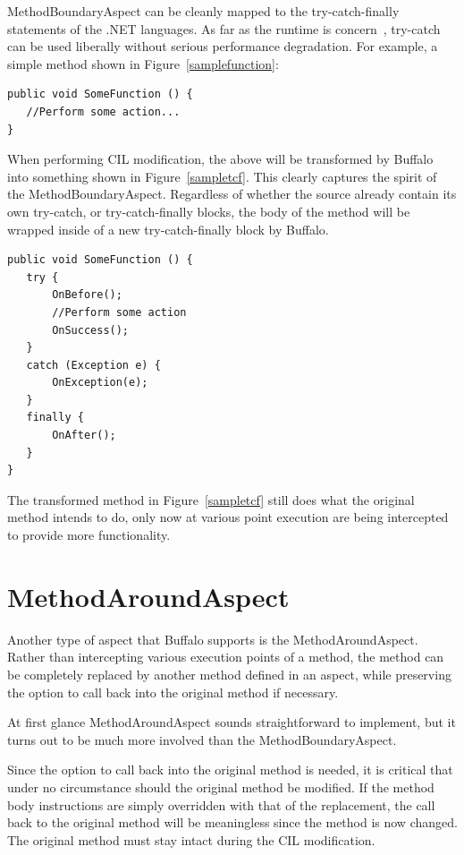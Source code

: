 MethodBoundaryAspect can be cleanly mapped to the try-catch-finally statements of the .NET languages. As far as the runtime is concern~\cite{ecma334, ecma335}, try-catch can be used liberally without serious performance degradation. For example, a simple method shown in Figure~\ref{samplefunction}:

\begin{lstlisting}[caption={Sample function}, label=samplefunction]
public void SomeFunction () {
   //Perform some action...
}
\end{lstlisting}

When performing CIL modification, the above will be transformed by Buffalo into something shown in Figure~\ref{sampletcf}. This clearly captures the spirit of the MethodBoundaryAspect. Regardless of whether the source already contain its own try-catch, or try-catch-finally blocks, the body of the method will be wrapped inside of a new try-catch-finally block by Buffalo.

\begin{lstlisting}[caption={Sample try-catch-finally}, label=sampletcf]
public void SomeFunction () {
   try {
       OnBefore();
       //Perform some action
       OnSuccess();
   }
   catch (Exception e) {
       OnException(e);
   }
   finally {
       OnAfter();
   }
}
\end{lstlisting}

The transformed method in Figure~\ref{sampletcf} still does what the original method intends to do, only now at various point execution are being intercepted to provide more functionality. 

\section{MethodAroundAspect}
Another type of aspect that Buffalo supports is the MethodAroundAspect. Rather than intercepting various execution points of a method, the method can be completely replaced by another method defined in an aspect, while preserving the option to call back into the original method if necessary.

At first glance MethodAroundAspect sounds straightforward to implement, but it turns out to be much more involved than the MethodBoundaryAspect.

Since the option to call back into the original method is needed, it is critical that under no circumstance should the original method be modified. If the method body instructions are simply overridden with that of the replacement, the call back to the original method will be meaningless since the method is now changed. The original method must stay intact during the CIL modification.


